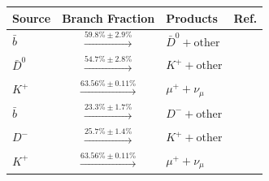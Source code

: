     \begin{table}
    \centering
    \begin{tabular}{lcll}
      Source      & Branch Fraction                         & Products                  & Ref.     \\
      \hline
      $\bar{b}$   & $\xrightarrow{59.8   \% \pm 2.9    \%}$ & $\bar{D}^{0} + \textrm{other}$ &  \cite{pdg_2012} \\
      $\bar{D}^0$ & $\xrightarrow{54.7   \% \pm 2.8    \%}$ & $K^+         + \textrm{other}$ &  \cite{pdg_2008} \\
      $K^+$       & $\xrightarrow{63.56  \% \pm 0.11   \%}$ & $\mu^+ + \nu_{\mu}$            &  \cite{pdg_2014} \\
      \hline
      $\bar{b}$   & $\xrightarrow{23.3   \% \pm 1.7    \%}$ & $D^-   + \textrm{other}$       &  \cite{pdg_2012} \\
      $D^-$       & $\xrightarrow{25.7   \% \pm 1.4    \%}$ & $K^+   + \textrm{other}$       &  \cite{pdg_2008} \\
      $K^+$       & $\xrightarrow{63.56  \% \pm 0.11   \%}$ & $\mu^+ + \nu_{\mu}$            &  \cite{pdg_2014} \\


\end{tabular}
\end{table}
